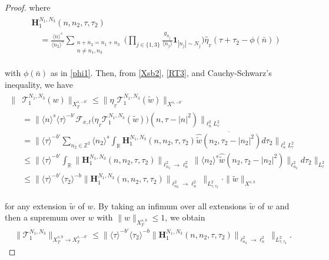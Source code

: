 \documentclass[%
11pt,  reqno]{amsart}
\newcommand{\1}{\hspace{0.2mm}\text{I}\hspace{0.2mm}}
\newcommand{\noi}{\noindent}
\newcommand{\Z}{\mathbb{Z}}
\newcommand{\R}{\mathbb{R}}
\newcommand{\F}{\mathcal{F}}
\newcommand{\ft}{\widehat}
\newcommand{\wt}{\widetilde}
\newcommand{\cj}{\overline}
\renewcommand{\l}{\ell}
\newcommand{\jb}[1]
{\langle #1 \rangle}
\newcommand{\ind}{\mathbf 1}
\numberwithin{equation}{section}
\numberwithin{theorem}{section}
\newcommand{\Hb}{\mathbf{H}}
\newcommand{\TT}{\mathcal{T}}
\begin{document}
\begin{proof}
\noi
where 
\begin{align}
\begin{split}
& \Hb_1^{N_1, N_3} (n,n_2,\tau, \tau_2)  \\
& \quad =  \frac{\jb{n}^{s}}{ \jb{n_2}^{s}} 
\sum_{\substack{n + n_2 = n_1 + n_3\\ n \neq n_1,n_3}} 
\bigg(\prod_{j \in \{1, 3\}}
\frac{g_{n_j} }{\jb{n_j}}
\ind_{|n_j|\sim N_j}\bigg)
\ft \eta_{_T} (\tau + \tau_2 - \phi (\bar n))  
\end{split}
\label{RT4}
\end{align}

\noi
with  $\phi (\bar n)$ as in \eqref{phi1}. 
Then, 
from 
\eqref{Xsb2}, \eqref{RT3}, 
and Cauchy-Schwarz's inequality, 
we have 
\begin{align}
\begin{split}
 \| &  \TT_1^{N_1,N_3} (w) \|_{X^{s,  -b'}_T} 
\le \| \eta_{_T} \TT_1^{N_1,N_3} (\wt w)
\|_{X^{s,  -b'}} \\
& = \big\| \jb{n}^s \jb{\tau}^{-b'}
 \F_{x, t} 
\big(\eta_{_T} \TT_1^{N_1,N_3} (\wt w)\big)
 (n,\tau -|n|^2) 
 \big \|_{\l^2_n L_\tau^2} \\ 
& = \bigg\| \jb{\tau}^{- b'}
\sum_{n_2\in \Z^2} \jb{n_2}^s 
\int_\R 
\Hb_1^{N_1, N_3} (n,n_2,\tau, \tau_2) 
\cj{ \ft {\wt w}(n_2, \tau_2 - |n_2|^2) } 
d\tau_2
\bigg\|_{ \l^2_n L^2_{\tau}}\\  
& \le \bigg\|\jb{\tau}^{- b'}  \int_\R  
 \| \Hb_1^{N_1, N_3} (n,n_2,\tau, \tau_2) \|_{\l^2_{n_2} \to \l^2_n} 
 \| \jb{n_2}^s  \ft {\wt w} (n_2,\tau_2 - |n_2|^2) \|_{\l^2_{n_2}}   d\tau_2 \bigg\|_{L^2_{\tau}} \\
& \le \big\| \jb{\tau}^{- b'} \jb{\tau_2}^{-b} 
\| \Hb_1^{N_1, N_3}  (n,n_2,\tau, \tau_2) \|_{\l^2_{n_2} \to \l^2_n} \big\|_{L^2_{\tau, \tau_2}} \cdot \|\wt w\|_{X^{s,b}}
\end{split} 
\label{RT5}
\end{align}

\noi 
for any extension $\wt w$ of $w$.
By taking an infimum over all extensions $\wt w$ of $w$
and then a supremum over $w$ with $\|w\|_{ X^{s,b}_T} \le 1$, 
we  obtain 
\begin{align}
 \|  \TT_1^{N_1,N_3}  \|_{X^{s,  b}_T\to  X^{s,-b'}_T} 
 \le \big\| \jb{\tau}^{- b'} \jb{\tau_2}^{-b} 
\| \Hb_1^{N_1, N_3}  (n,n_2,\tau, \tau_2) \|_{\l^2_{n_2} \to \l^2_n} \big\|_{L^2_{\tau, \tau_2}}.
\label{RT6}
\end{align}







\end{proof}
\end{document}

